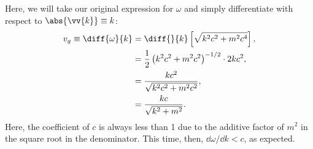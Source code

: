\begin{parts}
\item Here, we will take our original expression for $\omega$ and simply differentiate with respect to $\abs{\vv{k}} \equiv k$:
    \begin{align}
        v_g \equiv \diff{\omega}{k} &= \diff{}{k} \left[\sqrt{k^2c^2 + m^2c^4}\right], \\ 
        &= \frac{1}{2}\left(k^2c^2 + m^2c^2\right)^{-1/2} \cdot 2kc^2, \\
        &= \frac{kc^2}{\sqrt{k^2c^2 + m^2c^2}}, \\
        &= \frac{kc}{\sqrt{k^2 + m^2}}.
    \end{align}
    Here, the coefficient of $c$ is always less than 1 due to the additive factor of $m^2$ in the square root in the denominator. This time, then, $\dd\omega/\dd k < c$, as expected.

    





\end{parts}